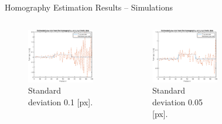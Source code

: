 \documentclass{beamer}
\begin{document}
\begin{frame}{Homography Estimation Results -- Simulations}
\begin{columns}[T]
\begin{figure}
		\includegraphics[height=0.375\textheight]{Hom/rect_1e-1}
		\vspace{-1.25em}
		\caption{Standard deviation 0.1 [px].}
	\end{figure}
	\begin{figure}
		\includegraphics[height=0.375\textheight]{Hom/rect_5e-2}
		\vspace{-1.25em}
		\caption{Standard deviation 0.05 [px].}
	\end{figure}
	\vspace{-2.5em}
	\begin{figure}

\end{figure}
\end{columns}
\end{frame}
\end{document}
